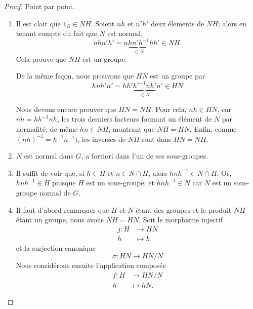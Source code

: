 \begin{proof}
    Point par point.
    \begin{enumerate}
        \item
            Il est clair que \( 1_G \in NH \). Soient $nh$ et $n'h'$ deux élements de \( NH \); alors en tenant compte du fait que \( N\) est normal,
            \begin{equation}
                nhn'h'=n\underbrace{hn'h^{-1}}_{\in N}hh'\in NH.
            \end{equation}
            Cela prouve que \( NH\) est un groupe.

            De la même façon, nous prouvons que \( HN\) est un groupe par
            \begin{equation}
                hnh'n'=hh'\underbrace{h'^{-1}nh'}_{\in N}n'\in HN
            \end{equation}

            Nous devons encore prouver que \( HN=NH\). Pour cela, \( nh \in HN \), car \( nh = hh^{-1}nh \), les trois derniers facteurs formant un  élément de \( N \) par normalité; de même \( hn \in NH \), montrant que \( NH = HN \). Enfin, comme \( (nh)^{-1} = h^{-1} n^{-1}) \), les inverses de \( NH \) sont dans \( HN = NH \).
        \item 
            \( N\) est normal dans \( G \), a fortiori dans l'un de ses sous-groupes.
        \item
            Il suffit de voir que, si \( h \in H \) et \( n \in N \cap H \), alors \( hnh^{-1} \in N \cap H \). Or, \( hnh^{-1} \in H \) puisque \( H\) est un sous-groupe; et \( hnh^{-1} \in N \) car \( N \) est un sous-groupe normal de \( G \).
        \item
            Il faut d'abord remarquer que \( H\) et \( N\) étant des groupes et le produit \( NH\) étant un groupe, nous avons \( NH=HN\). Soit le morphisme injectif
            \begin{equation}
                \begin{aligned}
                    j\colon H&\to HN \\
                    h&\mapsto h
                \end{aligned}
            \end{equation}
            et la surjection canonique
            \begin{equation}
                \sigma\colon HN\to HN/N 
            \end{equation}
            Nous considérons ensuite l'application composée
            \begin{equation}
                \begin{aligned}
                    f\colon H&\to HN/N \\
                    h&\mapsto hN. 
                \end{aligned}
            \end{equation}


\end{enumerate}
\end{proof}
